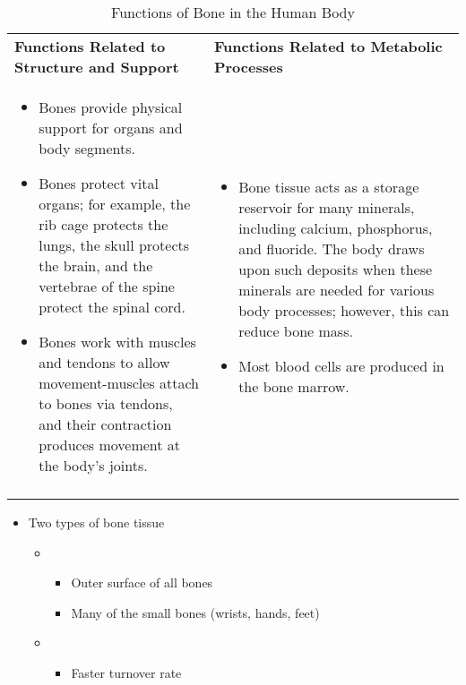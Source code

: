 \documentclass[title={Chapter 9}]{fdsn201notes}
\begin{document}
\begin{table}[H]
	\centering
	\caption{Functions of Bone in the Human Body}
	\label{tab:functions-of-bone}
	\begin{tabular}{p{}p{}}
		\rowcolor{rowdarkgreen}\textbf{Functions Related to Structure and Support} & \textbf{Functions Related to Metabolic Processes}\\
		\begin{itemize}
			\item Bones provide physical support for organs and body segments.
			\item Bones protect vital organs; for example, the rib cage protects the lungs, the skull protects the brain, and the vertebrae of the spine protect the spinal cord.
			\item Bones work with muscles and tendons to allow movement-muscles attach to bones via tendons, and their contraction produces movement at the body's joints.
		\end{itemize} & \begin{itemize}
			\item Bone tissue acts as a storage reservoir for many minerals, including calcium, phosphorus, and fluoride. The body draws upon such deposits when these minerals are needed for various body processes; however, this can reduce bone mass.
			\item Most blood cells are produced in the bone marrow.
		\end{itemize}\\
		\rowcolor{rowdarkgreen} & \\
	\end{tabular}
\end{table}

\begin{itemize}
	\item Two types of bone tissue
	\begin{itemize}
		\item {}
		\begin{itemize}
			\item Outer surface of all bones
			\item Many of the small bones (wrists, hands, feet)
		\end{itemize}
		\item {}
		\begin{itemize}
			\item Faster turnover rate
		\end{itemize}
	\end{itemize}
\end{itemize}
\end{document}
